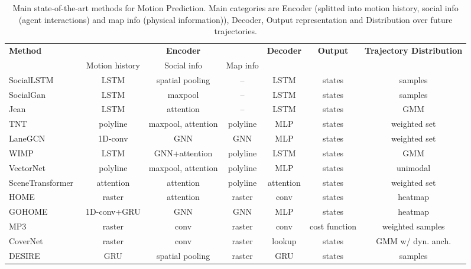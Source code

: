\begin{table}[h!]
	\centering
		\caption[Main state-of-the-art methods for Motion Prediction]{Main state-of-the-art methods for Motion Prediction. Main categories are Encoder (splitted into motion history, social info (agent interactions) and map info (physical information)), Decoder, Output representation and Distribution over future trajectories.}
	\begin{adjustbox}{max width=\textwidth}
		\begin{tabular}{l |ccc|c|c|c}
			
			\textbf{Method}	&	& \textbf{Encoder}	&	& \textbf{Decoder}	& \textbf{Output}  & \textbf{Trajectory Distribution}	\\
			& Motion history	& Social info	& Map info	&	&	&	\\
			\midrule
			\midrule
			SocialLSTM~\cite{alahi2016social}	& LSTM	& spatial pooling	& --	& LSTM	& states	& samples	\\
			SocialGan~\cite{gupta2018social}	& LSTM	& maxpool	& --	& LSTM	& states	& samples	\\
			Jean~\cite{mercat2020multi}	& LSTM	& attention	& --	& LSTM	& states	& GMM	\\
			TNT~\cite{zhao2021tnt}	& polyline	& maxpool, attention	& polyline	& MLP	& states	& weighted set	\\
			LaneGCN~\cite{liang2020learning}	& 1D-conv	& GNN	& GNN	& MLP	& states	& weighted set	\\
			WIMP~\cite{khandelwal2020if}	& LSTM	& GNN+attention	& polyline	& LSTM	& states	& GMM	\\
			VectorNet~\cite{gao2020vectornet}	& polyline	& maxpool, attention	& polyline	& MLP	& states	& unimodal	\\
			SceneTransformer~\cite{ngiam2022scene}	& attention	& attention	& polyline	& attention	& states	& weighted set	\\
			HOME~\cite{gilles2021home}	& raster	& attention	& raster	& conv	& states	& heatmap	\\
			GOHOME~\cite{gilles2022gohome}	& 1D-conv+GRU	& GNN	& GNN	& MLP	& states	& heatmap	\\
			MP3~\cite{casas2021mp3}	& raster	& conv	& raster	& conv	& cost function	& weighted samples	\\
			CoverNet~\cite{phan2020covernet}	& raster	& conv	& raster	& lookup	& states	& GMM w/ dyn. anch.	\\
			DESIRE~\cite{lee2017desire}	& GRU	& spatial pooling	& raster	& GRU	& states	& samples	\\

\end{tabular}
\end{adjustbox}
\end{table}
